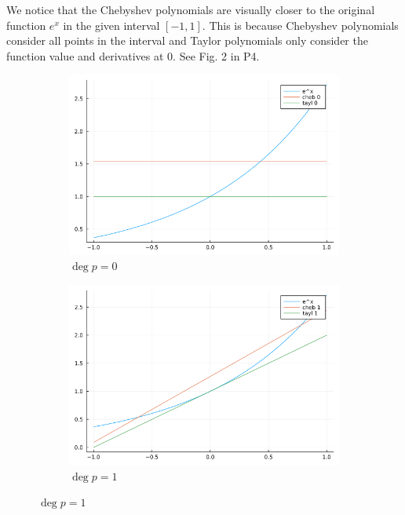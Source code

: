 \documentclass{article}
\newcommand{\1}{\bm 1}
\begin{document}
We notice that the Chebyshev polynomials are visually closer to the original function $e^x$ in the given interval $[-1, 1]$. This is because Chebyshev polynomials consider all points in the interval and Taylor polynomials only consider the function value and derivatives at 0. See Fig. 2 in P4.

\begin{figure}[!ht]
    \centering
    \begin{subfigure}[b]{0.48\textwidth}
        \centering
        \includegraphics[width=\textwidth]{compare-0.png}
        \caption{$\deg p=0$}
    \end{subfigure}
    \hfill
    \begin{subfigure}[b]{0.48\textwidth}
        \centering
        \includegraphics[width=\textwidth]{compare-1.png}
        \caption{$\deg p=1$}
    \end{subfigure}
    \newline

\end{figure}
\end{document}
